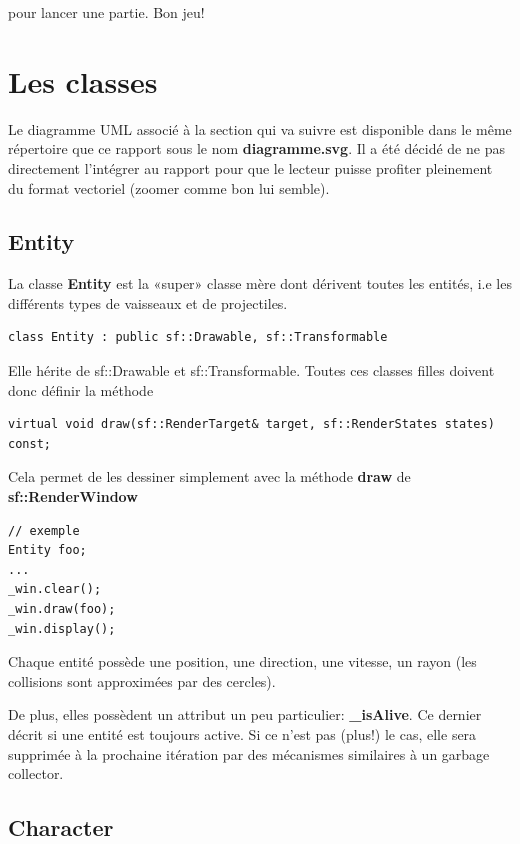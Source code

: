 \documentclass{article}
\begin{document}
pour lancer une partie. Bon jeu!

\section{Les classes}

Le diagramme UML associé à la section qui va suivre est disponible dans le même répertoire que ce rapport sous le nom \textbf{diagramme.svg}. Il a été décidé de ne pas directement l'intégrer au rapport pour que le lecteur puisse profiter pleinement du format vectoriel (zoomer comme bon lui semble).


\subsection{Entity}

La classe \textbf{Entity} est la «super» classe mère dont dérivent toutes les entités, i.e les différents types de vaisseaux et de projectiles.

\begin{verbatim} 
class Entity : public sf::Drawable, sf::Transformable
\end{verbatim}

Elle hérite de sf::Drawable et sf::Transformable. Toutes ces classes filles doivent donc définir la méthode

\begin{verbatim} 
virtual void draw(sf::RenderTarget& target, sf::RenderStates states) const;
\end{verbatim}

Cela permet de les dessiner simplement avec la méthode \textbf{draw} de \textbf{sf::RenderWindow}

\begin{verbatim}
// exemple
Entity foo;
...
_win.clear();
_win.draw(foo);
_win.display();
\end{verbatim}

Chaque entité possède une position, une direction, une vitesse, un rayon (les collisions sont approximées par des cercles).

De plus, elles possèdent un attribut un peu particulier: \textbf{\_isAlive}. Ce dernier décrit si une entité est toujours active. Si ce n'est pas (plus!) le cas, elle sera supprimée à la prochaine itération par des mécanismes similaires à un garbage collector.

\subsection{Character}
\end{document}
